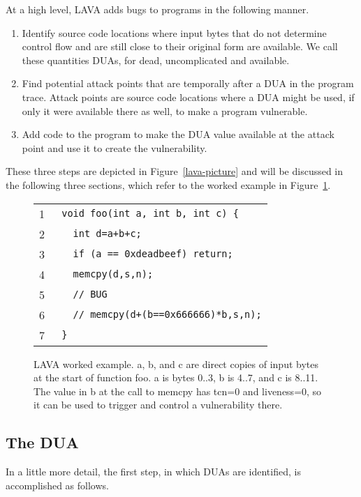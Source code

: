 
At a high level, LAVA adds bugs to programs in the following manner.

\begin {enumerate}
\item Identify source code locations where input bytes that do not determine control flow and are still close to their original form are available. 
We call these quantities DUAs, for dead, uncomplicated and available. 
\item Find potential attack points that are temporally after a DUA in the program trace.
Attack points are source code locations where a DUA might be used, if only it were available there as well, to make a program vulnerable. 
\item Add code to the program to make the DUA value available at the attack point and use it to create the vulnerability. 
\end{enumerate}

These three steps are depicted in Figure~\ref{lava-picture} and will be discussed in the following three sections,
which refer to the worked example in Figure~\ref{worked-example}.


\begin{figure} 
\begin{tabular}{ll}
1 & \verb+ void foo(int a, int b, int c) {+ \\
2 & \verb-   int d=a+b+c;- \\
3 & \verb+   if (a == 0xdeadbeef) return;+ \\ 
4 & \verb+   memcpy(d,s,n);+ \\
5 & \verb_   // BUG_ \\
6 & \verb_   // memcpy(d+(b==0x666666)*b,s,n);_ \\
7 & \verb+ }+ \\
\end{tabular}
\caption{
LAVA worked example.  
a, b, and c are direct copies of input bytes at the start of function foo.
a is bytes 0..3, b is 4..7, and c is 8..11.
The value in b at the call to memcpy has tcn=0 and liveness=0,
so it can be used to trigger and control a vulnerability there.
}
\label{worked-example}
\end{figure}



\subsection {The DUA}

In a little more detail, the first step, in which DUAs are identified, is accomplished as follows.  

